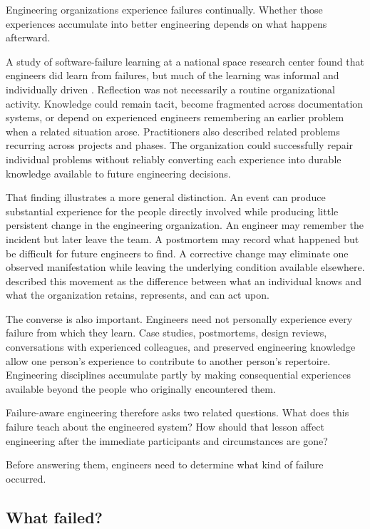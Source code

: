 Engineering organizations experience failures continually. Whether those experiences accumulate
into better engineering depends on what happens afterward.

A study of software-failure learning at a national space research center found that engineers did
learn from failures, but much of the learning was informal and individually driven
\citep{anandayuvaraj2026failures}. Reflection was not necessarily a routine organizational activity.
Knowledge could remain tacit, become fragmented across documentation systems, or depend on
experienced engineers remembering an earlier problem when a related situation arose. Practitioners
also described related problems recurring across projects and phases. The organization could
successfully repair individual problems without reliably converting each experience into durable
knowledge available to future engineering decisions.

That finding illustrates a more general distinction. An event can produce substantial experience
for the people directly involved while producing little persistent change in the engineering
organization. An engineer may remember the incident but later leave the team. A postmortem may
record what happened but be difficult for future engineers to find. A corrective change may
eliminate one observed manifestation while leaving the underlying condition available elsewhere.
\citet{ch-engineering-knowledge} described this movement as the difference between what an individual
knows and what the organization retains, represents, and can act upon.

The converse is also important. Engineers need not personally experience every failure from which
they learn. Case studies, postmortems, design reviews, conversations with experienced colleagues,
and preserved engineering knowledge allow one person's experience to contribute to another person's
repertoire. Engineering disciplines accumulate partly by making consequential experiences available
beyond the people who originally encountered them.

Failure-aware engineering therefore asks two related questions. What does this failure teach about
the engineered system? How should that lesson affect engineering after the immediate participants
and circumstances are gone?

Before answering them, engineers need to determine what kind of failure occurred.

\subsection{What failed?}\label{sec-what-failed}


